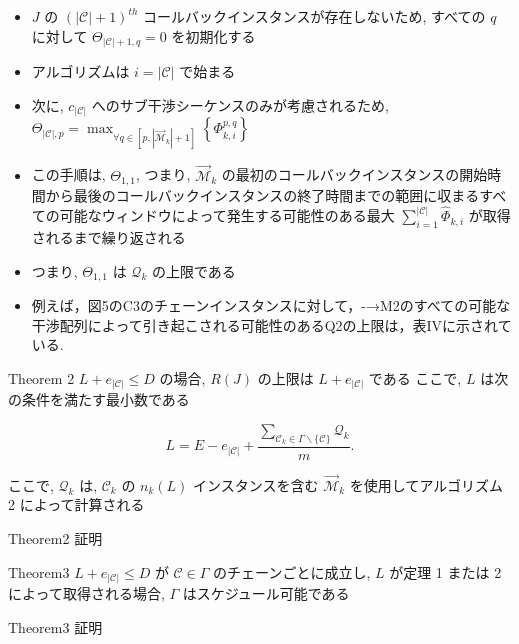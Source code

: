 \begin{frame}{}
    \begin{itemize}
        \item $J$ の $(|\mathcal{C}|+1)^{t h}$ コールバックインスタンスが存在しないため, すべての $q$ に対して $\Theta_{|\mathcal{C}|+1, q}=0$ を初期化する
        \item アルゴリズムは $i=|\mathcal{C}|$ で始まる
        \item 次に, $c_{|\mathcal{C}|}$ へのサブ干渉シーケンスのみが考慮されるため, $\Theta_{|\mathcal{C}|, p}=\max _{\forall q \in\left[p,\left|\overrightarrow{\mathcal{M}}_{k}\right|+1\right]}\left\{\Phi_{k, i}^{p, q}\right\}$
        \item この手順は, $\Theta_{1,1}$, つまり, $\overrightarrow{\mathcal{M}}_{k}$ の最初のコールバックインスタンスの開始時間から最後のコールバックインスタンスの終了時間までの範囲に収まるすべての可能なウィンドウによって発生する可能性のある最大 $\sum_{i=1}^{|\mathcal{C}|} \hat{\Phi}_{k, i}$ が取得されるまで繰り返される
        \item つまり, $\Theta_{1,1}$ は $\mathcal{Q}_{k}$ の上限である
    \end{itemize}
\end{frame}

\begin{frame}{}
    \begin{itemize}
        \item 例えば，図5のC3のチェーンインスタンスに対して，-→M2のすべての可能な干渉配列によって引き起こされる可能性のあるQ2の上限は，表IVに示されている.
    \end{itemize}
\end{frame}

\begin{frame}{Theorem 2}
    $L+e_{|\mathcal{C}|} \leq D$ の場合, $R(J)$ の上限は $L+e_{|\mathcal{C}|}$ である
    ここで, $L$ は次の条件を満たす最小数である

    \begin{equation*}
        L=E-e_{|\mathcal{C}|}+\frac{\sum_{\mathcal{C}_{k} \in \Gamma \backslash\{\mathcal{C}\}} \mathcal{Q}_{k}}{m} .
    \end{equation*}

    ここで, $\mathcal{Q}_{k}$ は, $\mathcal{C}_{k}$ の $n_{k}(L)$ インスタンスを含む $\overrightarrow{\mathcal{M}}_{k}$ を使用してアルゴリズム 2 によって計算される
\end{frame}

\begin{frame}{Theorem2 証明}
    \todo{}
\end{frame}

\begin{frame}{Theorem3}
    $L+e_{|\mathcal{C}|} \leq D$ が $\mathcal{C} \in \Gamma$ のチェーンごとに成立し, $L$ が定理 1 または 2 によって取得される場合, $\Gamma$ はスケジュール可能である
\end{frame}

\begin{frame}{Theorem3 証明}
    \todo{}
\end{frame}

